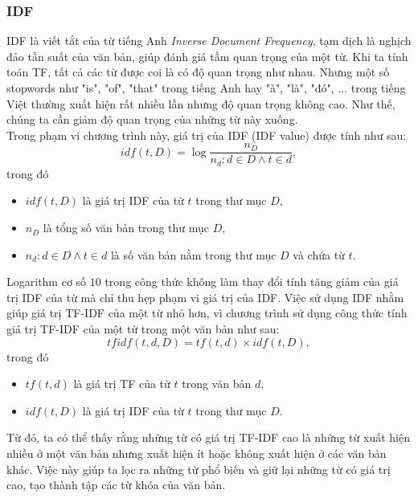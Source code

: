 \documentclass[12pt,a4paper]{article}
\begin{document}
\subsubsection{IDF}
IDF là viết tắt của từ tiếng Anh \textit{Inverse Document Frequency}, tạm dịch là nghịch đảo tần suất của văn bản, giúp đánh giá tầm quan trọng của một từ. Khi ta tính  toán TF, tất cả các từ được coi là có độ quan trọng như nhau. Nhưng một số stopwords như "is", "of", "that" trong tiếng Anh hay "à", "là", "đó", ... trong tiếng Việt thường xuất hiện rất nhiều lần nhưng độ quan trọng không cao. Như thế, chúng ta cần giảm độ quan trọng của những từ này xuống. \cite{1}\\
Trong phạm vi chương trình này, giá trị của IDF (IDF value) được tính như sau:
\begin{equation}
idf\left( {t,D} \right) = \log \frac{{{n_D}}}{{{n_d}:d \in D \wedge t \in d}},
\label{idffor}
\end{equation}
trong đó
\begin{itemize}
\item \(idf\left( {t,D} \right)\) là giá trị IDF của từ \(t\) trong thư mục \(D,\)
\item \({{n_D}}\) là tổng số văn bản trong thư mục \(D,\)
\item \({{n_d}:d \in D \wedge t \in d}\) là số văn bản nằm trong thư mục \(D\) và chứa từ \(t.\)
\end{itemize}
Logarithm cơ số \(10\) trong công thức không làm thay đổi tính tăng giảm của giá trị IDF của từ mà chỉ thu hẹp phạm vi giá trị của IDF. Việc sử dụng IDF nhằm giúp giá trị TF-IDF của một từ nhỏ hơn, vì chương trình sử dụng công thức tính giá trị TF-IDF của một từ trong một văn bản như sau:
\begin{equation}
tfidf\left( {t,d,D} \right) = tf\left( {t,d} \right) \times idf\left( {t,D} \right),
\label{tfidffor}
\end{equation}
trong đó
\begin{itemize}
\item \(tf\left( {t,d} \right)\) là giá trị TF của từ \(t\) trong văn bản \(d,\)
\item \(idf\left( {t,D} \right)\) là giá trị IDF của từ \(t\) trong thư mục \(D.\)
\end{itemize}
Từ đó, ta có thể thấy rằng những từ có giá trị TF-IDF cao là những từ xuất hiện nhiều ở một văn bản nhưng xuất hiện ít hoặc không xuất hiện ở các văn bản khác. Việc này giúp ta lọc ra những từ phổ biến và giữ lại những từ có giá trị cao, tạo thành tập các từ khóa của văn bản. \cite{1}\\
\end{document}
